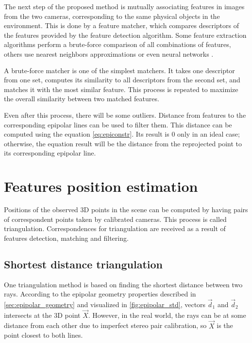 The next step of the proposed method is mutually associating features in images from the two cameras, corresponding to the same physical objects in the environment. 
This is done by a feature matcher, which compares descriptors of the features provided by the feature detection algorithm.
Some feature extraction algorithms perform a brute-force comparison of all combinations of features, others use nearest neighbors approximations or even neural networks \cite{Sarlin2020}.

A brute-force matcher is one of the simplest matchers.
It takes one descriptor from one set, computes its similarity to all descriptors from the second set, and matches it with the most similar feature. 
This process is repeated to maximize the overall similarity between two matched features.

Even after this process, there will be some outliers.
Distance from features to the corresponding epipolar lines can be used to filter them. 
This distance can be computed using the equation \autoref{eq:epiconstr}.
Its result is $0$ only in an ideal case; otherwise, the equation result will be the distance from the reprojected point to its corresponding epipolar line.

\section{Features position estimation}
Positions of the observed 3D points in the scene can be computed by having pairs of correspondent points taken by calibrated cameras.
This process is called triangulation.
Correspondences for triangulation are received as a result of features detection, matching and filtering.

\subsection{Shortest distance triangulation}
\label{sec:shortest_distance}
One triangulation method is based on finding the shortest distance between two rays.
According to the epipolar geometry properties described in \autoref{sec:epipolar_geometry} and visualized in \autoref{fig:epipolar_std}, vectors $\vec{d}_1$ and $\vec{d}_2$ intersects at the 3D point $\vec{X}$.
However, in the real world, the rays can be at some distance from each other due to imperfect stereo pair calibration, so $\vec{X}$ is the point closest to both lines.

